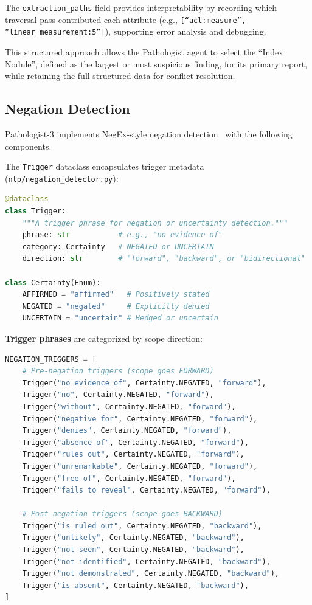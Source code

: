 \documentclass[12pt]{article}
\begin{document}
The \texttt{extraction\_paths} field provides interpretability by recording which traversal pass contributed each attribute (e.g., \texttt{[``acl:measure'', ``linear\_measurement:5'']}), supporting error analysis and debugging.

This structured approach allows the Pathologist agent to select the ``Index Nodule'', defined as the largest or most suspicious finding, for its primary report, while retaining the full structured data for conflict resolution.

\subsection{Negation Detection}
\label{subsec:negation-detection}

Pathologist-3 implements NegEx-style negation detection~\cite{chapman2001negex, harkema2009context} with the following components.

The \texttt{Trigger} dataclass encapsulates trigger metadata (\texttt{nlp/negation\_detector.py}):

\begin{lstlisting}[language=Python, caption={Trigger dataclass for NegEx.}]
@dataclass
class Trigger:
    """A trigger phrase for negation or uncertainty detection."""
    phrase: str           # e.g., "no evidence of"
    category: Certainty   # NEGATED or UNCERTAIN
    direction: str        # "forward", "backward", or "bidirectional"

class Certainty(Enum):
    AFFIRMED = "affirmed"   # Positively stated
    NEGATED = "negated"     # Explicitly denied
    UNCERTAIN = "uncertain" # Hedged or uncertain
\end{lstlisting}

\textbf{Trigger phrases} are categorized by scope direction:

\begin{lstlisting}[language=Python, caption={Negation trigger phrases (NegEx-based).}]
NEGATION_TRIGGERS = [
    # Pre-negation triggers (scope goes FORWARD)
    Trigger("no evidence of", Certainty.NEGATED, "forward"),
    Trigger("no", Certainty.NEGATED, "forward"),
    Trigger("without", Certainty.NEGATED, "forward"),
    Trigger("negative for", Certainty.NEGATED, "forward"),
    Trigger("denies", Certainty.NEGATED, "forward"),
    Trigger("absence of", Certainty.NEGATED, "forward"),
    Trigger("rules out", Certainty.NEGATED, "forward"),
    Trigger("unremarkable", Certainty.NEGATED, "forward"),
    Trigger("free of", Certainty.NEGATED, "forward"),
    Trigger("fails to reveal", Certainty.NEGATED, "forward"),
    
    # Post-negation triggers (scope goes BACKWARD)
    Trigger("is ruled out", Certainty.NEGATED, "backward"),
    Trigger("unlikely", Certainty.NEGATED, "backward"),
    Trigger("not seen", Certainty.NEGATED, "backward"),
    Trigger("not identified", Certainty.NEGATED, "backward"),
    Trigger("not demonstrated", Certainty.NEGATED, "backward"),
    Trigger("is absent", Certainty.NEGATED, "backward"),
]
\end{lstlisting}
\end{document}
